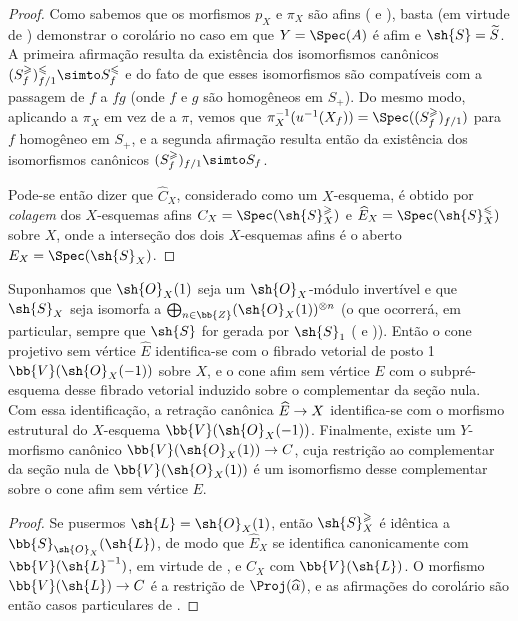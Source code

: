 \documentclass[oneside,10pt]{amsart}
\makeatletter
\renewcommand{\leq}{\leqslant}
\renewcommand{\geq}{\geqslant}
\newcommand{\ega@arrow}[2]{\mathchoice{#1}{#2}{#2}{#2}}
\renewcommand{\to}{\ega@arrow{\longrightarrow}{\rightarrow}}
\let\EGAOriginalLabel\label
\renewcommand{\label}[1]{\phantomsection\EGAOriginalLabel{#1}}
\makeatother
\begin{document}
\begin{proof}
Como sabemos que os morfismos $p_X$ e $\pi_X$ são afins ( e ), basta (em virtude de ) demonstrar o corolário no caso em que $Y=\Spec(A)$ é afim e $\sh{S}=\widetilde{S}$.
A primeira afirmação resulta da existência dos isomorfismos canônicos  $(S_f^\geq)_{f/1}^\leq \simto S_f^\leq$ e do fato de que esses isomorfismos são compatíveis com a passagem de $f$ a $fg$ (onde $f$ e $g$ são homogêneos em $S_+$).
Do mesmo modo, aplicando  a $\pi_X$ em vez de a $\pi$, vemos que $\pi_X^{-1}(u^{-1}(X_f)) = \Spec((S_f^\geq)_{f/1})$ para $f$ homogêneo em $S_+$, e a segunda afirmação resulta então da existência dos isomorfismos canônicos  $(S_f^\geq)_{f/1} \simto S_f$.

Pode-se então dizer que $\widehat{C}_X$, considerado como um $X$-esquema, é obtido por \emph{colagem} dos $X$-esquemas afins $C_X=\Spec(\sh{S}_X^\geq)$ e $\widehat{E}_X=\Spec(\sh{S}_X^\leq)$ sobre $X$, onde a interseção dos dois $X$-esquemas afins é o aberto $E_X=\Spec(\sh{S}_X)$.
\end{proof}
\begin{corollary}[8.6.4]
\label{II.8.6.4}
Suponhamos que $\sh{O}_X(1)$ seja um $\sh{O}_X$-módulo invertível e que $\sh{S}_X$ seja isomorfa a $\bigoplus_{n\in\bb{Z}}(\sh{O}_X(1))^{\otimes n}$ (o que ocorrerá, em particular, sempre que $\sh{S}$ for gerada por $\sh{S}_1$ ( e )).
Então o cone projetivo sem vértice $\widehat{E}$ identifica-se com o fibrado vetorial de posto 1 $\bb{V}(\sh{O}_X(-1))$ sobre $X$, e o cone afim sem vértice $E$ com o subpré-esquema desse fibrado vetorial induzido sobre o complementar da seção nula.
Com essa identificação, a retração canônica $\widehat{E}\to X$ identifica-se com o morfismo estrutural do $X$-esquema $\bb{V}(\sh{O}_X(-1))$.
Finalmente, existe um $Y$-morfismo canônico $\bb{V}(\sh{O}_X(1))\to C$, cuja restrição ao complementar da seção nula de $\bb{V}(\sh{O}_X(1))$ é um isomorfismo desse complementar sobre o cone afim sem vértice $E$.
\end{corollary}

\begin{proof}
Se pusermos $\sh{L}=\sh{O}_X(1)$, então $\sh{S}_X^\geq$ é idêntica a $\bb{S}_{\sh{O}_X}(\sh{L})$, de modo que $\widehat{E}_X$ se identifica canonicamente com $\bb{V}(\sh{L}^{-1})$, em virtude de , e $C_X$ com $\bb{V}(\sh{L})$.
O morfismo $\bb{V}(\sh{L})\to C$ é a restrição de $\Proj(\widehat{\alpha})$, e as afirmações do corolário são então casos particulares de .
\end{proof}
\end{document}
